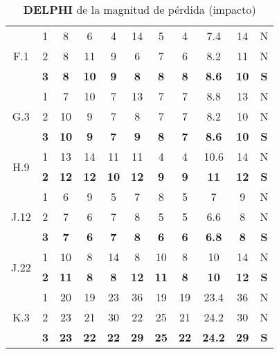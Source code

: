 \documentclass[11pt,a4paper,spanish,twoside]{book}
\begin{document}
\begin{table}[!h]
\begin{tabular}{|c|c||c|c|c|c|c||c|c|c||c|}
    \hline \multirow{3}{*}{F.1} 
    & 1 & 8 & 6  & 4 & 14 & 5 & 4 & 7.4 & 14 & N \\
    & 2 & 8 & 11 & 9 & 6  & 7 & 6 & 8.2 & 11 & N \\
    & \textbf{3} & \textbf{8} & \textbf{10} & \textbf{9} & \textbf{8} &
    \textbf{8} & \textbf{8} & \textbf{8.6} & \textbf{10} & \textbf{S} \\ 
    
    \hline \multirow{3}{*}{G.3} 
    & 1 & 7  & 10 & 7 & 13 & 7 & 7 & 8.8 & 13 & N \\
    & 2 & 10 & 9  & 7 & 8  & 7 & 7 & 8.2 & 10 & N \\
    & \textbf{3} & \textbf{10} & \textbf{9} & \textbf{7} & \textbf{9} &
    \textbf{8} & \textbf{7} & \textbf{8.6} & \textbf{10} & \textbf{S} \\ 
    
    \hline \multirow{2}{*}{H.9} 
    & 1 & 13 & 14 & 11 & 11 & 4 & 4 & 10.6 & 14 & N \\
    & \textbf{2} & \textbf{12} & \textbf{12} & \textbf{10} & \textbf{12} &
    \textbf{9} & \textbf{9} & \textbf{11} & \textbf{12} & \textbf{S} \\ 

    \hline \multirow{3}{*}{J.12} 
    & 1 & 6 & 9 & 5 & 7 & 8 & 5 & 7   & 9 & N \\
    & 2 & 7 & 6 & 7 & 8 & 5 & 5 & 6.6 & 8 & N \\
    & \textbf{3} & \textbf{7} & \textbf{6} & \textbf{7} & \textbf{8} &
    \textbf{6} & \textbf{6} & \textbf{6.8} & \textbf{8} & \textbf{S} \\ 

    \hline \multirow{2}{*}{J.22} 
    & 1 & 10 & 8 & 14 & 8 & 10 & 8 & 10 & 14 & N \\
    & \textbf{2} & \textbf{11} & \textbf{8} & \textbf{8} & \textbf{12} &
    \textbf{11} & \textbf{8} & \textbf{10} & \textbf{12} & \textbf{S} \\ 

    \hline \multirow{3}{*}{K.3} 
    & 1 & 20 & 19 & 23 & 36 & 19 & 19 & 23.4 & 36 & N \\
    & 2 & 23 & 21 & 30 & 22 & 25 & 21 & 24.2 & 30 & N \\
    & \textbf{3} & \textbf{23} & \textbf{22} & \textbf{22} & \textbf{29} &
    \textbf{25} & \textbf{22} & \textbf{24.2} & \textbf{29} & \textbf{S} \\ 
  \end{tabular}
  \caption{\textbf{DELPHI} de la magnitud de pérdida (impacto)}
  \label{Tab:DELPHImag}
\end{table}
\end{document}
